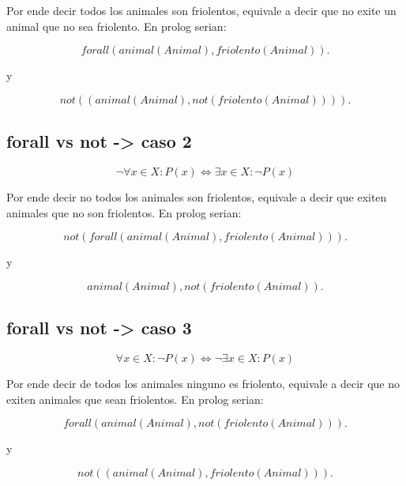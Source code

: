 \documentclass[11pt,a4paper]{article}
\begin{document}
Por ende decir todos los animales son friolentos, equivale a decir que no exite un animal que no sea friolento.
En prolog serian:

\begin{equation*}
	forall(animal(Animal), friolento(Animal)).
\end{equation*}  

y

\begin{equation*}
	not((animal(Animal),not(friolento(Animal)))).
\end{equation*}

\subsection{forall vs not -> caso 2}

\begin{equation}
	\neg \forall x \in X: P(x) \iff \exists x \in X: \neg P(x)
\end{equation}

Por ende decir no todos los animales son friolentos, equivale a decir que exiten animales que no son friolentos.
En prolog serian:

\begin{equation*}
	not (forall(animal(Animal), friolento(Animal))).
\end{equation*}  

y 

\begin{equation*}
	animal(Animal),not(friolento(Animal)).
\end{equation*}

 \subsection{forall vs not -> caso 3}
 
 \begin{equation}
	\forall x \in X: \neg P(x) \iff \neg \exists x \in X: P(x)
\end{equation}
 
Por ende decir de todos los animales ninguno es friolento, equivale a decir que no exiten animales que sean friolentos.
En prolog serian:
 
\begin{equation*}
	forall(animal(Animal), not(friolento(Animal))).
\end{equation*}  

y

\begin{equation*}
	not((animal(Animal),friolento(Animal))).
\end{equation*}
\end{document}
